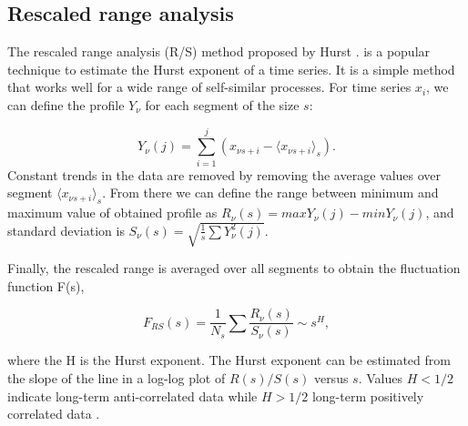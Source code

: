 
\subsection{Rescaled range analysis} 

The rescaled range analysis (R/S) method proposed by Hurst \cite{hurst1951long}. is a popular technique to estimate the Hurst exponent of a time series. It is a simple method that works well for a wide range of self-similar processes. For time series $x_i$, we can define the profile $Y_\nu$ for each segment of the size $s$:

$$Y_\nu(j) = \sum_{i=1}^{j} (x_{\nu s +i} - \langle x_{\nu s + i } \rangle _s).$$
Constant trends in the data are removed by removing the average values over segment $\langle x_{\nu s + i } \rangle _s$. From there we can define the range between minimum and maximum value of obtained profile as $R_{\nu}(s) = max Y_\nu(j) - min Y_{\nu}(j)$, and standard deviation is $S_{\nu}(s) = \sqrt{\frac{1}{s}\sum Y^2_{\nu}(j)}$. 

Finally, the rescaled range is averaged over all segments to obtain the fluctuation function F(s),

$$F_{RS}(s) = \frac{1}{N_s}\sum \frac{R_{\nu}(s)}{S_{\nu}(s)} \sim s^H,$$

where the H is the Hurst exponent. The Hurst exponent can be estimated from the slope of the line in a log-log plot of $R(s)/S(s)$ versus $s$. Values $H<1/2$ indicate long-term anti-correlated data while $H>1/2$ long-term positively correlated data \cite{kantelhardt2008fractal}. 




